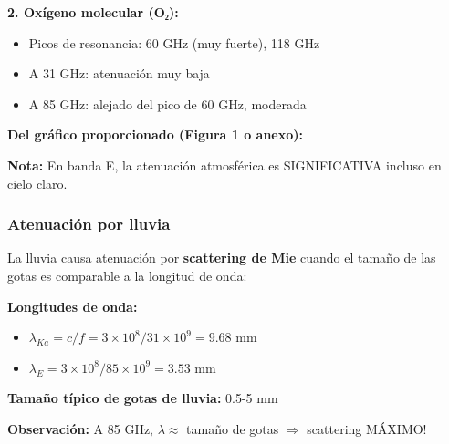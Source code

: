 \documentclass[a4paper,10pt]{article}
\begin{document}
\textbf{2. Oxígeno molecular (O₂):}
\begin{itemize}
    \item Picos de resonancia: 60 GHz (muy fuerte), 118 GHz
    \item A 31 GHz: atenuación muy baja
    \item A 85 GHz: alejado del pico de 60 GHz, moderada
\end{itemize}

\textbf{Del gráfico proporcionado (Figura 1 o anexo):}

\begin{center}
\end{center}

\textbf{Nota:} En banda E, la atenuación atmosférica es SIGNIFICATIVA incluso en cielo claro.

\subsubsection{Atenuación por lluvia}

La lluvia causa atenuación por \textbf{scattering de Mie} cuando el tamaño de las gotas es comparable a la longitud de onda:

\textbf{Longitudes de onda:}
\begin{itemize}
    \item $\lambda_{Ka} = c/f = 3 \times 10^8 / 31 \times 10^9 = 9.68$ mm
    \item $\lambda_E = 3 \times 10^8 / 85 \times 10^9 = 3.53$ mm
\end{itemize}

\textbf{Tamaño típico de gotas de lluvia:} 0.5-5 mm

\textbf{Observación:} A 85 GHz, $\lambda \approx$ tamaño de gotas $\Rightarrow$ scattering MÁXIMO!
\end{document}
